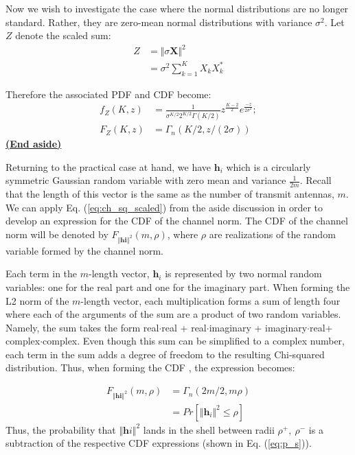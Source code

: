 Now we wish to investigate the case where the normal distributions are no longer standard. Rather, they are zero-mean normal distributions with variance $\sigma^2$. Let $Z$ denote the scaled sum:
\begin{equation}\label{eq:ch_sq_sum_scaled}
    \begin{aligned}
        Z &= \Vert \sigma \textbf{X} \Vert^2\\
          &= \sigma^2 \sum_{k = 1}^K X_kX_k^*
    \end{aligned}
\end{equation}

Therefore the associated PDF and CDF become:
\begin{equation}\label{eq:ch_sq_scaled}
    \begin{aligned}
        f_Z(K,z) &= \frac{1}{\sigma^{K/2}2^{K/2}\Gamma(K/2)}z^{\frac{K-2}{2}}e^{\frac{-z}{2\sigma^2}};\\
        F_Z(K,z) &= \Gamma_n(K/2,z/(2\sigma))
    \end{aligned}
\end{equation}
\underline{\textbf{(End aside)}}

Returning to the practical case at hand, we have  $\textbf{h}_i$ which is a circularly symmetric Gaussian random variable with zero mean and variance  $\frac{1}{2m}$. Recall that the length of this vector is the same as the number of transmit antennas, $m$. We can apply Eq. (\ref{eq:ch_sq_scaled}) from the aside discussion in order to develop an expression for the CDF of the channel norm. The CDF of the channel norm will be denoted by $F_{\Vert\textbf{hi}\Vert^2}(m,\rho)$, where $\rho$ are realizations of the random variable formed by the channel norm. 

Each term in the $m$-length vector, $\textbf{h}_i$ is represented by two normal random variables: one for the real part and one for the imaginary part. When forming the L2 norm of the $m$-length vector, each multiplication forms a sum of length four where each of the arguments of the sum are a product of two random variables. Namely, the sum takes the form real$\cdot$real + real$\cdot$imaginary + imaginary$\cdot$real+ complex$\cdot$complex. Even though this sum can be simplified to a complex number, each term in the sum adds a degree of freedom to the resulting Chi-squared distribution. Thus, when forming the CDF , the expression becomes:

\begin{equation}\label{eq:ch_sq_cdf_chan}
    \begin{aligned}
        F_{\Vert\textbf{hi}\Vert^2}(m,\rho)& = \Gamma_n(2m/2,m\rho)\\
        &= Pr[\Vert\textbf{h}_i\Vert^2 \leq \rho]
    \end{aligned}
\end{equation}
 Thus, the probability that $\Vert\textbf{h}i\Vert^2$ lands in the shell between radii $\rho^+,\ \rho^-$ is a subtraction of the respective CDF expressions (shown in Eq. (\ref{eq:p_s})).

